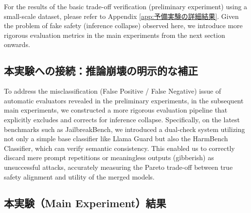 \documentclass{article}
\begin{document}
For the results of the basic trade-off verification (preliminary experiment) using a small-scale dataset, please refer to Appendix \ref{app:予備実験の詳細結果}. Given the problem of fake safety (inference collapse) observed here, we introduce more rigorous evaluation metrics in the main experiments from the next section onwards.


\subsection{本実験への接続：推論崩壊の明示的な補正}

To address the misclassification (False Positive / False Negative) issue of automatic evaluators revealed in the preliminary experiments, in the subsequent main experiments, we constructed a more rigorous evaluation pipeline that explicitly excludes and corrects for inference collapse. Specifically, on the latest benchmarks such as JailbreakBench, we introduced a dual-check system utilizing not only a simple base classifier like Llama Guard but also the HarmBench Classifier, which can verify semantic consistency. This enabled us to correctly discard mere prompt repetitions or meaningless outputs (gibberish) as unsuccessful attacks, accurately measuring the Pareto trade-off between true safety alignment and utility of the merged models.

\subsection{本実験（Main Experiment）結果}

\end{document}
